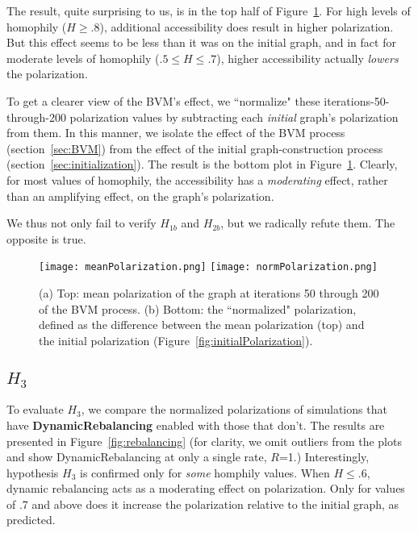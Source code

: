 The result, quite surprising to us, is in the top half of
Figure~\ref{fig:meanNormPolarization}. For high levels of homophily
($H\geq.8$), additional accessibility does result in higher polarization. But
this effect seems to be less than it was on the initial graph, and in fact for
moderate levels of homophily ($.5 \leq H \leq .7$), higher accessibility
actually \textit{lowers} the polarization. 

To get a clearer view of the BVM's effect, we ``normalize" these
iterations-50-through-200 polarization values by subtracting each
\textit{initial} graph's polarization from them. In this manner, we isolate
the effect of the BVM process (section~\ref{sec:BVM}) from the effect of the
initial graph-construction process (section~\ref{sec:initialization}). The
result is the bottom plot in Figure~\ref{fig:meanNormPolarization}. Clearly,
for most values of homophily, the accessibility has a \textit{moderating}
effect, rather than an amplifying effect, on the graph's polarization. 

We thus not only fail to verify $H_{1b}$ and $H_{2b}$, but we radically refute
them. The opposite is true.

\begin{figure}
\centering
\texttt{[image: meanPolarization.png]}
\texttt{[image: normPolarization.png]}

\caption{(a) Top: mean polarization of the graph at iterations 50 through 200
of the BVM process. (b) Bottom: the ``normalized" polarization, defined as the
difference between the mean polarization (top) and the initial polarization
(Figure~\ref{fig:initialPolarization}).}
\label{fig:meanNormPolarization}
\end{figure}

\subsection{$H_{3}$}

To evaluate $H_3$, we compare the normalized polarizations of simulations that
have \textbf{DynamicRebalancing} enabled with those that don't. The results
are presented in Figure~\ref{fig:rebalancing} (for clarity, we omit outliers
from the plots and show DynamicRebalancing at only a single rate, $R$=1.)
Interestingly, hypothesis $H_3$ is confirmed only for \textit{some} homphily
values. When $H\leq.6$, dynamic rebalancing acts as a moderating effect on
polarization. Only for values of .7 and above does it increase the
polarization relative to the initial graph, as predicted. 

